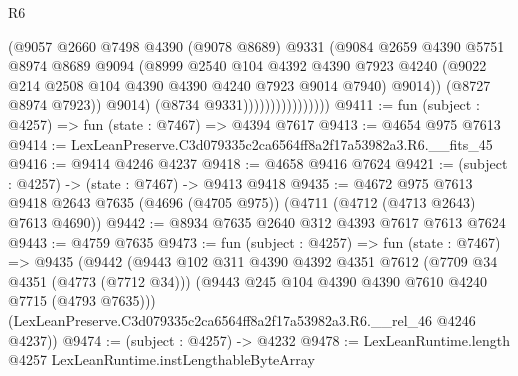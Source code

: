 \begin{lexlean}{R6}
\begin{coremodule}
                                    (@9057
                                      @2660
                                      @7498
                                      @4390
                                      (@9078 @8689)
                                      @9331
                                      (@9084
                                        @2659
                                        @4390
                                        @5751
                                        @8974
                                        @8689
                                        @9094
                                        (@8999
                                          @2540
                                          @104
                                          @4392
                                          @4390
                                          @7923
                                          @4240
                                          (@9022
                                            @214
                                            @2508
                                            @104
                                            @4390
                                            @4390
                                            @4240
                                            @7923
                                            @9014
                                            @7940)
                                          @9014))
                                      (@8727 @8974 @7923))
                                    @9014)
                                  (@8734 @9331))))))))))))))))
@9411 := fun (subject : @4257) => fun (state : @7467) => @4394 @7617
@9413 := @4654 @975 @7613
@9414 := LexLeanPreserve.C3d079335c2ca6564ff8a2f17a53982a3.R6.__fits_45
@9416 := @9414 @4246 @4237
@9418 := @4658 @9416 @7624
@9421 := (subject : @4257) -> (state : @7467) -> @9413 @9418
@9435 := @4672
    @975
    @7613
    @9418
    @2643
    @7635
    (@4696 (@4705 @975))
    (@4711 (@4712 (@4713 @2643) @7613 @4690))
@9442 := @8934 @7635 @2640 @312 @4393 @7617 @7613 @7624
@9443 := @4759 @7635
@9473 := fun (subject : @4257) =>
  fun (state : @7467) =>
  @9435
    (@9442
      (@9443
        @102
        @311
        @4390
        @4392
        @4351
        @7612
        (@7709 @34 @4351 (@4773 (@7712 @34)))
        (@9443 @245 @104 @4390 @4390 @7610 @4240 @7715 (@4793 @7635)))
      (LexLeanPreserve.C3d079335c2ca6564ff8a2f17a53982a3.R6.__rel_46 @4246 @4237))
@9474 := (subject : @4257) -> @4232
@9478 := LexLeanRuntime.length @4257 LexLeanRuntime.instLengthableByteArray

\end{coremodule}
\end{lexlean}
